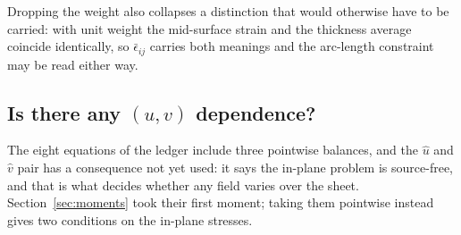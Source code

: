 \documentclass[11pt]{article}
\begin{document}
Dropping the weight also collapses a distinction that would otherwise have to be
carried: with unit weight the mid-surface strain and the thickness average
coincide identically, so $\bar\epsilon_{ij}$ carries both meanings and the
arc-length constraint may be read either way.

\subsection{Is there any \texorpdfstring{$(u,v)$}{(u,v)} dependence?}\label{sec:uv}
The eight equations of the ledger include three pointwise balances, and the
$\hat u$ and $\hat v$ pair has a consequence not yet used: it says the in-plane
problem is source-free, and that is what decides whether any field varies over
the sheet.  Section~\ref{sec:moments} took their first moment; taking them
pointwise instead gives two conditions on the in-plane stresses.
\end{document}
